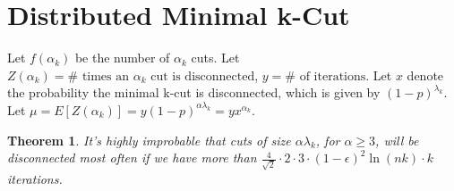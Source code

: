 \documentclass{acm_proc_article-sp}
\newtheorem{theorem}{Theorem}
\begin{document}
\section{Distributed Minimal k-Cut}

Let $f(\alpha_k)$ be the number of $\alpha_k$ cuts. Let \\
$Z(\alpha_k) = \# \text{ times an } \alpha_k \text{ cut is disconnected}$, 
$y = \# \text{ of iterations}$. Let $x$ denote the probability the minimal k-cut is disconnected, which is given by $(1 - p)^{\lambda_k}$. Let $\mu = E[Z(\alpha_k)] = y(1-p)^{\alpha \lambda_k} = yx^{\alpha_k}$.

\begin{theorem} 
It's highly improbable that cuts of size $\alpha \lambda_k$, for $\alpha \geq 3$, will be disconnected most often if we have more than $\frac{4}{\sqrt{2}} \cdot 2 \cdot 3 \cdot (1-\epsilon)^2 \ln{(nk)} \cdot k$ iterations.
\end{theorem}
\end{document}
